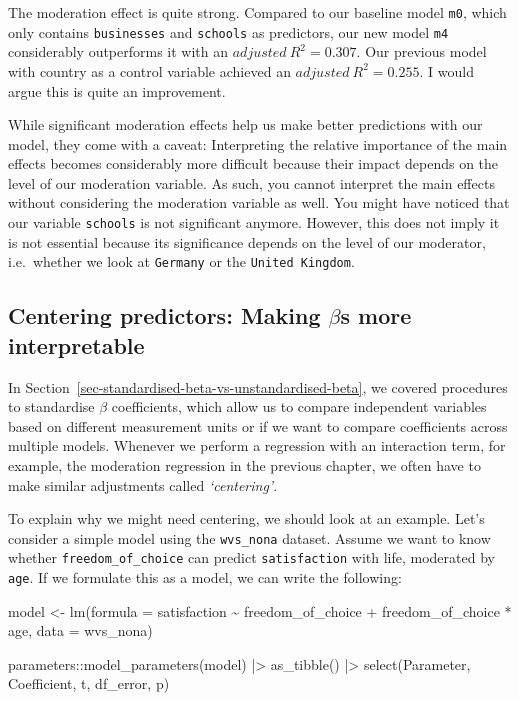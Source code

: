 \documentclass[
  letterpaper,
  DIV=11,
  numbers=noendperiod]{scrreprt}
\newenvironment{Shaded}{\begin{snugshade}}{\end{snugshade}}
\newcommand{\AttributeTok}[1]{\textcolor[rgb]{0.40,0.45,0.13}{#1}}
\newcommand{\FunctionTok}[1]{\textcolor[rgb]{0.28,0.35,0.67}{#1}}
\newcommand{\NormalTok}[1]{\textcolor[rgb]{0.00,0.23,0.31}{#1}}
\newcommand{\OtherTok}[1]{\textcolor[rgb]{0.00,0.23,0.31}{#1}}
\newcommand{\SpecialCharTok}[1]{\textcolor[rgb]{0.37,0.37,0.37}{#1}}
\begin{document}
The moderation effect is quite strong. Compared to our baseline model
\texttt{m0}, which only contains \texttt{businesses} and
\texttt{schools} as predictors, our new model \texttt{m4} considerably
outperforms it with an \(adjusted\ R^2 = 0.307\). Our previous model
with country as a control variable achieved an
\(adjusted\ R^2 = 0.255\). I would argue this is quite an improvement.

While significant moderation effects help us make better predictions
with our model, they come with a caveat: Interpreting the relative
importance of the main effects becomes considerably more difficult
because their impact depends on the level of our moderation variable. As
such, you cannot interpret the main effects without considering the
moderation variable as well. You might have noticed that our variable
\texttt{schools} is not significant anymore. However, this does not
imply it is not essential because its significance depends on the level
of our moderator, i.e.~whether we look at \texttt{Germany} or the
\texttt{United\ Kingdom}.

\subsection{\texorpdfstring{Centering predictors: Making \(\beta\)s more
interpretable}{Centering predictors: Making \textbackslash betas more interpretable}}\label{sec-centering-predictors}

In Section~\ref{sec-standardised-beta-vs-unstandardised-beta}, we
covered procedures to standardise \(\beta\) coefficients, which allow us
to compare independent variables based on different measurement units or
if we want to compare coefficients across multiple models. Whenever we
perform a regression with an interaction term, for example, the
moderation regression in the previous chapter, we often have to make
similar adjustments called \emph{`centering'}.

To explain why we might need centering, we should look at an example.
Let's consider a simple model using the \texttt{wvs\_nona} dataset.
Assume we want to know whether \texttt{freedom\_of\_choice} can predict
\texttt{satisfaction} with life, moderated by \texttt{age}. If we
formulate this as a model, we can write the following:

\begin{Shaded}
\begin{Highlighting}[]
\NormalTok{model }\OtherTok{\textless{}{-}} \FunctionTok{lm}\NormalTok{(}\AttributeTok{formula =}\NormalTok{ satisfaction }\SpecialCharTok{\textasciitilde{}}
\NormalTok{              freedom\_of\_choice }\SpecialCharTok{+}
\NormalTok{              freedom\_of\_choice }\SpecialCharTok{*}\NormalTok{ age,}
            \AttributeTok{data =}\NormalTok{ wvs\_nona)}

\NormalTok{parameters}\SpecialCharTok{::}\FunctionTok{model\_parameters}\NormalTok{(model) }\SpecialCharTok{|\textgreater{}}
  \FunctionTok{as\_tibble}\NormalTok{() }\SpecialCharTok{|\textgreater{}}
  \FunctionTok{select}\NormalTok{(Parameter, Coefficient, t, df\_error, p)}
\end{Highlighting}
\end{Shaded}
\end{document}
